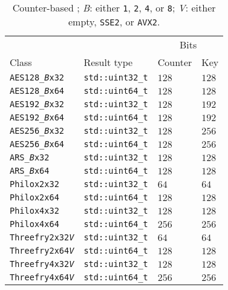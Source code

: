 \begin{table}
  \def\B{\textcolor{MRed}{\textit{B}}}
  \def\V{\textcolor{MRed}{\textit{V}}}
  \begin{tabularx}{\textwidth}{XXll}
    \toprule
    & & \multicolumn{2}{c}{Bits} \\
    \cmidrule{3-4}
    Class & Result type & Counter & Key \\
    \midrule
    \texttt{AES128\_\B x32} & \verb|std::uint32_t| & $128$ & $128$ \\
    \texttt{AES128\_\B x64} & \verb|std::uint64_t| & $128$ & $128$ \\
    \texttt{AES192\_\B x32} & \verb|std::uint32_t| & $128$ & $192$ \\
    \texttt{AES192\_\B x64} & \verb|std::uint64_t| & $128$ & $192$ \\
    \texttt{AES256\_\B x32} & \verb|std::uint32_t| & $128$ & $256$ \\
    \texttt{AES256\_\B x64} & \verb|std::uint64_t| & $128$ & $256$ \\
    \texttt{ARS\_\B x32}    & \verb|std::uint32_t| & $128$ & $128$ \\
    \texttt{ARS\_\B x64}    & \verb|std::uint64_t| & $128$ & $128$ \\
    \texttt{Philox2x32}     & \verb|std::uint32_t| & $64$  & $64$  \\
    \texttt{Philox2x64}     & \verb|std::uint64_t| & $128$ & $128$ \\
    \texttt{Philox4x32}     & \verb|std::uint32_t| & $128$ & $128$ \\
    \texttt{Philox4x64}     & \verb|std::uint64_t| & $256$ & $256$ \\
    \texttt{Threefry2x32\V} & \verb|std::uint32_t| & $64$  & $64$  \\
    \texttt{Threefry2x64\V} & \verb|std::uint64_t| & $128$ & $128$ \\
    \texttt{Threefry4x32\V} & \verb|std::uint32_t| & $128$ & $128$ \\
    \texttt{Threefry4x64\V} & \verb|std::uint64_t| & $256$ & $256$ \\
    \bottomrule
  \end{tabularx}
  \caption{Counter-based \rng; \B: either \texttt{1}, \texttt{2}, \texttt{4},
    or \texttt{8}; \V: either empty, \texttt{SSE2}, or \texttt{AVX2}.}
  \label{tab:Counter-based RNG}
\end{table}

